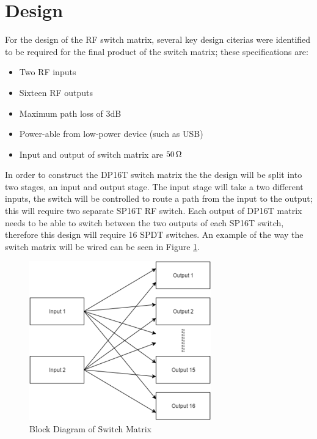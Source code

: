 \documentclass[12pt,openany,a4paper]{book}
\newcommand{\ohm}	{\ensuremath{\rm\,\Omega}}
\begin{document}
\section{Design}	\label{sec:design}
For the design of the RF switch matrix, several key design citerias were identified to be required for the final product of the switch matrix; these specifications are:
\begin{itemize}
	\setlength\itemsep{-0.5em}
	\item Two RF inputs
	\item Sixteen RF outputs
	\item Maximum path loss of $3$dB
	\item Power-able from low-power device (such as USB)
	\item Input and output of switch matrix are $50\ohm$
\end{itemize}
In order to construct the DP16T switch matrix the the design will be split into two stages, an input and output stage. The input stage will take a two different inputs, the switch will be controlled to route a path from the input to the output; this will require two separate SP16T RF switch. Each output of DP16T matrix needs to be able to switch between the two outputs of each SP16T switch, therefore this design will require 16 SPDT switches. An example of the way the switch matrix will be wired can be seen in Figure \ref{fig:block-swmtx}.\\[0.2cm]
\begin{figure}[h]
	\centering
    \includegraphics[width=0.7\textwidth]{switchmtx-block.png}
	\caption{Block Diagram of Switch Matrix}
	\label{fig:block-swmtx}
\end{figure} 
\end{document}
